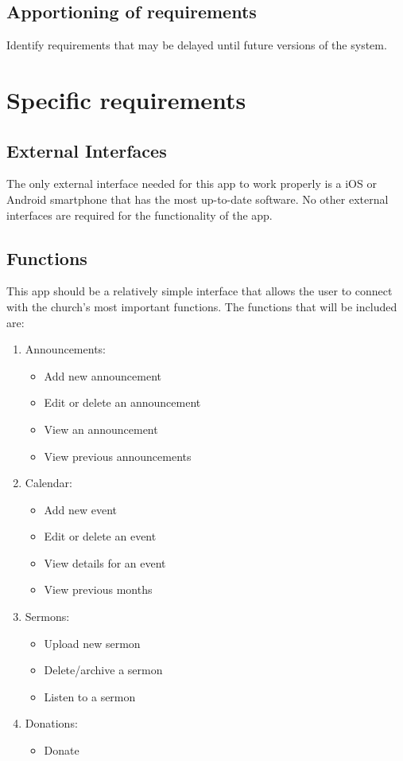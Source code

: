 \documentclass[letterpaper,10pt,draftclsnofoot,onecolumn,compsoc,titlepage]{IEEEtran}
\begin{document}
	\subsection{Apportioning of requirements}
	Identify requirements that may be delayed until future versions of the system.

	\section{Specific requirements}
	\subsection{External Interfaces}
	The only external interface needed for this app to work properly is a iOS or Android smartphone that has the most up-to-date software.
	No other external interfaces are required for the functionality of the app.

	\subsection{Functions}
	This app should be a relatively simple interface that allows the user to connect with the church's most important functions.
	The functions that will be included are:
	\begin{enumerate}
		\item{Announcements:}
			\begin{itemize}
				\item{Add new announcement}
				\item{Edit or delete an announcement}
				\item{View an announcement}
				\item{View previous announcements}
			\end{itemize}
		\item{Calendar:}
			\begin{itemize}
				\item{Add new event}
				\item{Edit or delete an event}
				\item{View details for an event}
				\item{View previous months}
			\end{itemize}
		\item{Sermons:}
			\begin{itemize}
				\item{Upload new sermon}
				\item{Delete/archive a sermon}
				\item{Listen to a sermon}
			\end{itemize}
		\item{Donations:}
			\begin{itemize}
				\item{Donate}
			\end{itemize}
	\end{enumerate}
\end{document}
